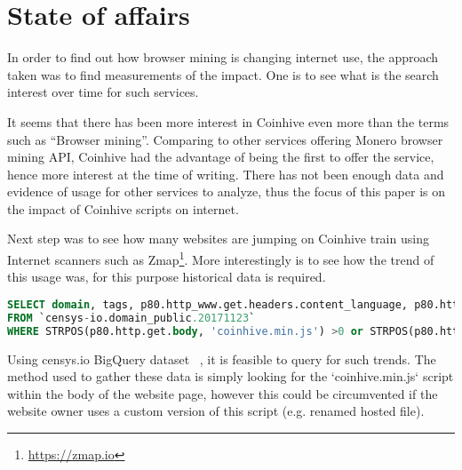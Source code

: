 \section{State of affairs}
In order to find out how browser mining is changing internet use, the approach taken was to find measurements of the impact. One is to see what is the search interest over time for such services. 

\begin{center}
	\caption{Google Trend - Search interest over last 12 months}
\end{center}

It seems that there has been more interest in Coinhive even more than the terms such as ``Browser mining''. Comparing to other services offering Monero browser mining API, Coinhive had the advantage of being the first to offer the service, hence more interest at the time of writing. There has not been enough data and evidence of usage for other services to analyze, thus the focus of this paper is on the impact of Coinhive scripts on internet. 

Next step was to see how many websites are jumping on Coinhive train using Internet scanners such as Zmap\footnote{\url{https://zmap.io}}. More interestingly is to see how the trend of this usage was, for this purpose historical data is required. 

\begin{lstlisting}[caption={BigQuery SQL query to find websites using coinhive miner script using censys.io datasets},label={lst:bigquery},language=sql]
SELECT domain, tags, p80.http_www.get.headers.content_language, p80.http_www.get.headers.server, p80.http.get.headers.x_powered_by, p80.http.get.title , p80.http_www.get.body as wwwbody, p80.http.get.body as plainbody
FROM `censys-io.domain_public.20171123`
WHERE STRPOS(p80.http.get.body, 'coinhive.min.js') >0 or STRPOS(p80.http_www.get.body, 'coinhive.min.js') >0)
\end{lstlisting}


Using censys.io BigQuery dataset ~\cite{censys15}, it is feasible to query for such trends. The method used to gather these data is simply looking for the `coinhive.min.js` script within the body of the website page, however this could be circumvented if the website owner uses a custom version of this script (e.g. renamed hosted file).


\begin{center}
	\caption{Usage of CoinHive Miner scripts in top 1 million websites over time}
\end{center}

